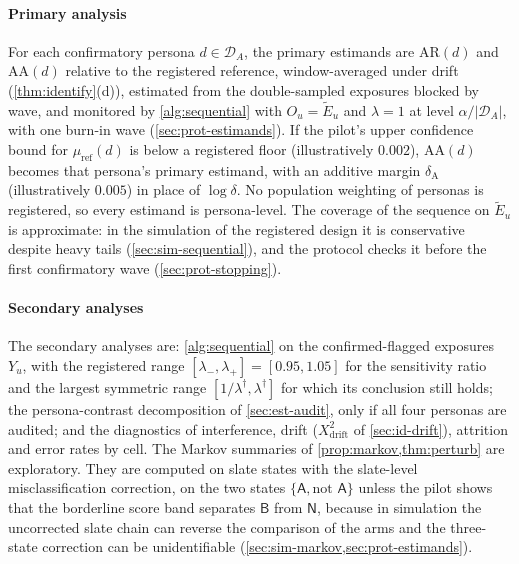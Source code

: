 \paragraph{Primary analysis}
For each confirmatory persona $d\in\mathcal D_A$, the primary estimands are $\mathrm{AR}(d)$ and $\mathrm{AA}(d)$ relative to the registered reference, window-averaged under drift (\cref{thm:identify}(d)), estimated from the double-sampled exposures blocked by wave, and monitored by \cref{alg:sequential} with $O_u=\widetilde E_u$ and $\lambda=1$ at level $\alpha/|\mathcal D_A|$, with one burn-in wave (\cref{sec:prot-estimands}). If the pilot's upper confidence bound for $\mu_{\mathrm{ref}}(d)$ is below a registered floor (illustratively $0.002$), $\mathrm{AA}(d)$ becomes that persona's primary estimand, with an additive margin $\delta_{\mathrm A}$ (illustratively $0.005$) in place of $\log\delta$. No population weighting of personas is registered, so every estimand is persona-level.
The coverage of the sequence on $\widetilde E_u$ is approximate: in the simulation of the registered design it is conservative despite heavy tails (\cref{sec:sim-sequential}), and the protocol checks it before the first confirmatory wave (\cref{sec:prot-stopping}).

\paragraph{Secondary analyses}
The secondary analyses are: \cref{alg:sequential} on the confirmed-flagged exposures $Y_u$, with the registered range $[\lambda_-,\lambda_+]=[0.95,1.05]$ for the sensitivity ratio and the largest symmetric range $[1/\lambda^\dagger,\lambda^\dagger]$ for which its conclusion still holds; the persona-contrast decomposition of \cref{sec:est-audit}, only if all four personas are audited; and the diagnostics of interference, drift ($X^2_{\mathrm{drift}}$ of \cref{sec:id-drift}), attrition and error rates by cell.
The Markov summaries of \cref{prop:markov,thm:perturb} are exploratory. They are computed on slate states with the slate-level misclassification correction, on the two states $\{\mathsf A,\text{not }\mathsf A\}$ unless the pilot shows that the borderline score band separates $\mathsf B$ from $\mathsf N$, because in simulation the uncorrected slate chain can reverse the comparison of the arms and the three-state correction can be unidentifiable (\cref{sec:sim-markov,sec:prot-estimands}).

